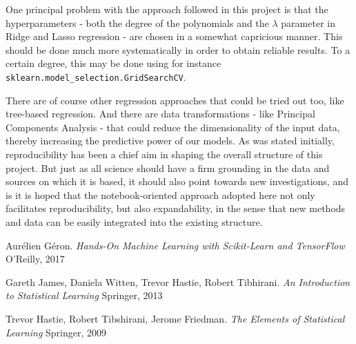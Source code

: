 \documentclass{article}
\begin{document}
One principal problem with the approach followed in this project is that the hyperparameters - both the degree of the polynomials and the $\lambda$ parameter in Ridge and Lasso regression - are chosen in a somewhat capricious manner. This should be done much more systematically in order to obtain reliable results. To a certain degree, this may be done using for instance \texttt{sklearn.model\_selection.GridSearchCV}.

There are of course other regression approaches that could be tried out too, like tree-based regression. And there are data transformations - like Principal Components Analysis - that could reduce the dimensionality of the input data, thereby increasing the predictive power of our models. As was stated initially, reproducibility has been a chief aim in shaping the overall structure of this project. But just as all science should have a firm grounding in the data and sources on which it is based, it should also point towards new investigations, and is it is hoped that the notebook-oriented approach adopted here not only facilitates reproducibility, but also expandability, in the sense that new methods and data can be easily integrated into the existing structure.

\begin{thebibliography}{3}
    Aur\'elien G\'eron.
    \textit{Hands-On Machine Learning with Scikit-Learn and TensorFlow}
    O'Reilly, 2017

    Gareth James, Daniela Witten, Trevor Hastie, Robert Tibhirani.
    \textit{An Introduction to Statistical Learning}
    Springer, 2013

    Trevor Hastie, Robert Tibshirani, Jerome Friedman.
    \textit{The Elements of Statistical Learning}
    Springer, 2009
\end{thebibliography}
\end{document}
